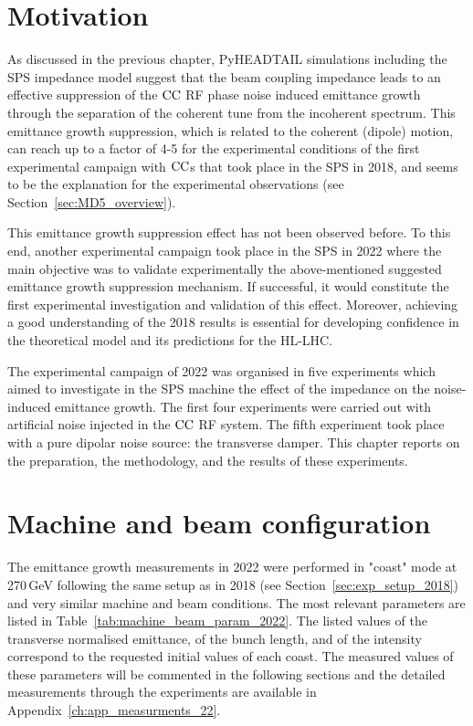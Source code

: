 \section{Motivation}\label{sec:motivation_md_2022}
As discussed in the previous chapter, PyHEADTAIL simulations including the SPS impedance model suggest that the beam coupling impedance leads to an effective suppression of the ${\mathrm{CC}}$ RF phase noise induced emittance growth through the separation of the coherent tune from the incoherent spectrum. This emittance growth suppression, which is related to the coherent (dipole) motion, can reach up to a factor of 4-5 for the experimental conditions of the first experimental campaign with ${\mathrm{CC}}$s that took place in the SPS in 2018, and seems to be the explanation for the experimental observations (see Section~\ref{sec:MD5_overview}).

This emittance growth suppression effect has not been observed before. To this end, another experimental campaign took place in the SPS in 2022 where the main objective was to validate experimentally the above-mentioned suggested emittance growth suppression mechanism. If successful, it would constitute the first experimental investigation and validation of this effect. Moreover, achieving a good understanding of the 2018 results is essential for developing confidence in the theoretical model and its predictions for the HL-LHC.

The experimental campaign of 2022 was organised in five experiments which aimed to investigate in the SPS machine the effect of the impedance on the noise-induced emittance growth. The first four experiments were carried out with artificial noise injected in the ${\mathrm{CC}}$ RF system. The fifth experiment took place with a pure dipolar noise source: the transverse damper. This chapter reports on the preparation, the methodology, and the results of these experiments.



\section{Machine and beam configuration}\label{sec:cc_md_2022_parameters}
The emittance growth measurements in 2022 were performed in "coast" mode at 270\,GeV following the same setup as in 2018 (see Section~\ref{sec:exp_setup_2018}) and very similar machine and beam conditions. The most relevant parameters are listed in Table~\ref{tab:machine_beam_param_2022}. The listed values of the transverse normalised emittance, of the bunch length, and of the intensity correspond to the requested initial values of each coast. The measured values of these parameters will be commented in the following sections and the detailed measurements through the experiments are available in Appendix~\ref{ch:app_measurments_22}. 

